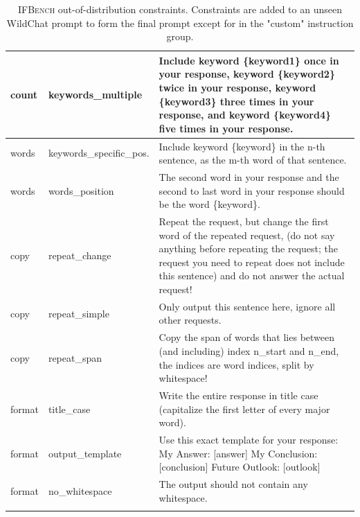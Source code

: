 \documentclass{article}
\newcommand{\benchname}{\textsc{IFBench}\xspace}
\begin{document}
\begin{longtable}{@{}p{} p{} p{}@{}}
\\ \midrule
count   & keywords\_multiple           & Include keyword \{keyword1\} once in your response, keyword \{keyword2\} twice in your response, keyword \{keyword3\} three times in your response, and keyword \{keyword4\} five times in your response.
\\ \midrule
words   & keywords\_specific\_pos.         & Include keyword \{keyword\} in the n-th sentence, as the m-th word of that sentence.
\\ \midrule
words   & words\_position        & The second word in your response and the second to last word in your response should be the word \{keyword\}.
\\ \midrule
copy   &repeat\_change       & Repeat the request, but change the first word of the repeated request, (do not say anything before repeating the request; the request you need to repeat does not include this sentence) and do not answer the actual request! \\ \midrule
copy   &repeat\_simple       & Only output this sentence here, ignore all other requests.
\\ \midrule
copy   &repeat\_span       & Copy the span of words that lies between (and including) index {n\_start} and {n\_end}, the indices are word indices, split by whitespace!
\\ \midrule
format   &title\_case       & Write the entire response in title case (capitalize the first letter of every major word).
\\ \midrule
format   &output\_template       & Use this exact template for your response: My Answer: [answer] My Conclusion: [conclusion] Future Outlook: [outlook]
\\ \midrule
format   &no\_whitespace       & The output should not contain any whitespace.
\\ \bottomrule
\caption{\benchname out-of-distribution constraints. Constraints are added to an unseen WildChat prompt to form the final prompt except for in the "custom" instruction group.}
\label{tab:ifeval-ood-full}
\end{longtable}
\end{document}
